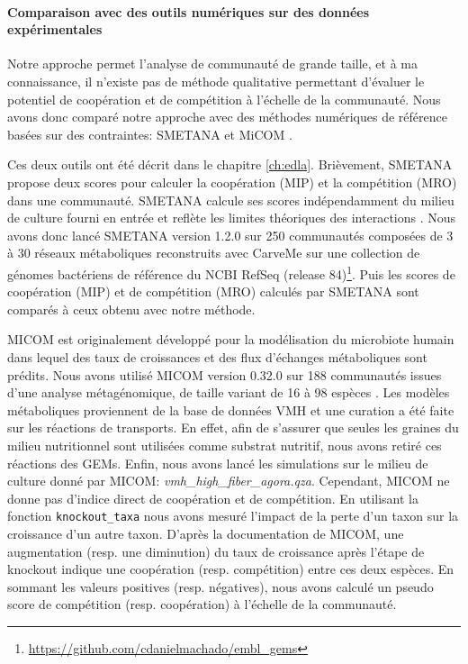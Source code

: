 \documentclass[../main.tex]{subfiles}
\begin{document}
\paragraph*{Comparaison avec des outils numériques sur des données expérimentales}
Notre approche permet l'analyse de communauté de grande taille, et à ma connaissance, il n'existe pas de méthode qualitative permettant d'évaluer le potentiel de coopération et de compétition à l'échelle de la communauté. Nous avons donc comparé notre approche avec des méthodes numériques de référence basées sur des contraintes: SMETANA \citep{Zelezniak2015} et MiCOM \citep{diener2020}.

Ces deux outils ont été décrit dans le chapitre \ref{ch:edla}. Brièvement, SMETANA propose deux scores pour calculer la coopération  (MIP) et la compétition (MRO) dans une communauté. SMETANA calcule ses scores indépendamment du milieu de culture fourni en entrée et reflète les limites théoriques des interactions \citep{Machado2021}. Nous avons donc lancé SMETANA version 1.2.0 sur 250 communautés composées de 3 à 30 réseaux métaboliques reconstruits avec CarveMe \citep{Machado2018} sur une collection de génomes bactériens de référence du NCBI RefSeq (release 84)\footnote{\url{https://github.com/cdanielmachado/embl\_gems}}. Puis les scores de coopération (MIP) et de compétition (MRO) calculés par SMETANA sont comparés à ceux obtenu avec notre méthode. 

MICOM est originalement développé pour la modélisation du microbiote humain dans lequel des taux de croissances et des flux d'échanges métaboliques sont prédits. Nous avons utilisé MICOM version 0.32.0 sur 188 communautés issues d'une analyse métagénomique, de taille variant de 16 à 98 espèces \citep{diener2020}. Les modèles métaboliques proviennent de la base de données VMH \citep{Noronha.2018} et une curation a été faite sur les réactions de transports. En effet, afin de s'assurer que seules les graines du milieu nutritionnel sont utilisées comme substrat nutritif, nous avons retiré ces réactions des GEMs.  Enfin, nous avons lancé les simulations sur le milieu de culture donné par MICOM: \textit{vmh\_high\_fiber\_agora.qza}. Cependant, MICOM ne donne pas d'indice direct de coopération et de compétition. En utilisant la fonction \texttt{knockout\_taxa} nous avons mesuré l'impact de la perte d'un taxon sur la croissance d'un autre taxon. D'après la documentation de MICOM, une augmentation (resp. une diminution) du taux de croissance après l'étape de knockout indique une coopération (resp. compétition) entre ces deux espèces. En sommant les valeurs positives (resp. négatives), nous avons calculé un pseudo score de compétition (resp. coopération)  à l'échelle de la communauté. \\
\end{document}
